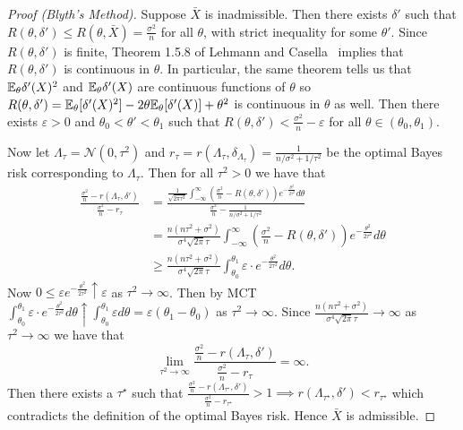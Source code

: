 \begin{proof}[Proof (Blyth's Method)]
	
	Suppose $\bar{X}$ is inadmissible. Then there exists $\delta'$ such that $R(\theta, \delta') \le R(\theta, \bar{X}) = \frac{\sigma^2}{n}$ for all $\theta$, with strict inequality for some $\theta'$. Since $R(\theta, \delta')$ is finite, Theorem 1.5.8 of Lehmann and Casella~\cite[p.~27]{LehmannCasella1998} implies that $R(\theta, \delta')$ is continuous in $\theta$. In particular, the same theorem tells us that $\mathbb{E}_\theta \delta'(X)^2$ and $\mathbb{E}_\theta \delta'(X)$ are continuous functions of $\theta$ so $R(\theta, \delta') = \mathbb{E}_\theta[\delta'(X)^2] - 2\theta\mathbb{E}_\theta[\delta'(X)] + \theta^2$ is continuous in $\theta$ as well. Then there exists $\varepsilon > 0$ and $\theta_0 < \theta' < \theta_1$ such that $R(\theta, \delta') < \frac{\sigma^2}{n} - \varepsilon$ for all $\theta \in (\theta_0, \theta_1)$. 
	
	\medskip\noindent Now let $\Lambda_\tau = \mathcal{N}(0, \tau^2)$ and $r_{\tau} = r(\Lambda_\tau, \delta_{\Lambda_\tau}) = \frac{1}{n/\sigma^2 + 1/\tau^2}$ be the optimal Bayes risk corresponding to $\Lambda_\tau$. Then for all $\tau^2 > 0$ we have that
	\begin{align*}
		\frac{\frac{\sigma^2}{n} - r(\Lambda_\tau, \delta')}{\frac{\sigma^2}{n}  - r_{\tau}} 
		&= \frac{ \frac{1}{\sqrt{2\pi \tau^2}} \int_{-\infty}^\infty (\frac{\sigma^2}{n} - R(\theta, \delta')) e^{-\frac{\theta^2}{2\tau^2}} d\theta }{\frac{\sigma^2}{n} - \frac{1}{n/\sigma^2 + 1/\tau^2}} \\
		&= \frac{n(n\tau^2 + \sigma^2)}{ \sigma^4 \sqrt{2\pi} \tau } \int_{-\infty}^\infty \left(\tfrac{\sigma^2}{n} - R(\theta, \delta')\right) e^{-\frac{\theta^2}{2\tau^2}} d\theta \\
		&\geq \frac{n(n\tau^2 + \sigma^2)}{ \sigma^4 \sqrt{2\pi} \tau } \int_{\theta_0}^{\theta_1} \varepsilon \cdot e^{-\frac{\theta^2}{2\tau^2}} d\theta.
	\end{align*}
	Now $0 \leq \varepsilon e^{-\frac{\theta^2}{2\tau^2}} \uparrow \varepsilon$ as $\tau^2 \to \infty$. Then by MCT $\int_{\theta_0}^{\theta_1} \varepsilon \cdot e^{-\frac{\theta^2}{2\tau^2}} d\theta \uparrow \int_{\theta_0}^{\theta_1} \varepsilon d\theta = \varepsilon (\theta_1 - \theta_0)$ as $\tau^2 \to \infty$. Since $\frac{n(n\tau^2 + \sigma^2)}{ \sigma^4 \sqrt{2\pi} \tau } \to \infty$ as $\tau^2 \to \infty$ we have that \[
		\lim_{\tau^2 \to \infty} \frac{\frac{\sigma^2}{n} - r(\Lambda_\tau, \delta')}{\frac{\sigma^2}{n}  - r_{\tau}}  = \infty.
	\]
	Then there exists a $\tau^\star$ such that $\frac{\frac{\sigma^2}{n} - r(\Lambda_{\tau^\star}, \delta')}{\frac{\sigma^2}{n}  - r_{\tau^\star}} > 1 \implies r(\Lambda_{\tau^\star}, \delta') < r_{\tau^\star}$ which contradicts the definition of the optimal Bayes risk. Hence $\bar X$ is admissible.
\end{proof}

